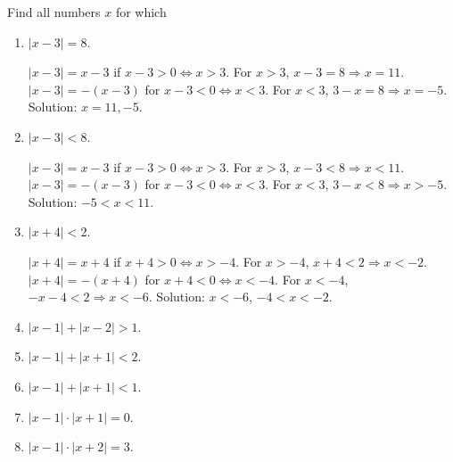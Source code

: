 \documentclass[12pt]{article}
\newcommand{\then}{\Rightarrow}
\newcommand{\abs}[1]{|#1|}
\begin{document}

\item Find all numbers $x$ for which
\begin{enumerate}[label=(\roman*)]
\item $\abs{x-3}=8$.

$\abs{x-3}=x-3$ if $x-3>0\iff x>3$. For $x>3$, $x-3=8\then x=11$. $\abs{x-3}=-(x-3)$ for $x-3<0\iff x<3$. For $x<3$, $3-x=8\then x=-5$.
Solution: $x=11,-5$.

\item $\abs{x-3}<8$.

$\abs{x-3}=x-3$ if $x-3>0\iff x>3$. For $x>3$, $x-3<8\then x<11$. $\abs{x-3}=-(x-3)$ for $x-3<0\iff x<3$. For $x<3$, $3-x<8\then x>-5$.
Solution: $-5<x<11$.

\item $\abs{x+4}<2$.

$\abs{x+4}=x+4$ if $x+4>0\iff x>-4$. For $x>-4$, $x+4<2\then x<-2$. $\abs{x+4}=-(x+4)$ for $x+4<0\iff x<-4$. For $x<-4$, $-x-4<2\then x<-6$.
Solution: $x<-6$, $-4<x<-2$.

\item $\abs{x-1}+\abs{x-2}>1$.



\item $\abs{x-1}+\abs{x+1}<2$.



\item $\abs{x-1}+\abs{x+1}<1$.



\item $\abs{x-1}\cdot\abs{x+1}=0$.



\item $\abs{x-1}\cdot\abs{x+2}=3$.




\end{enumerate}
\end{document}
